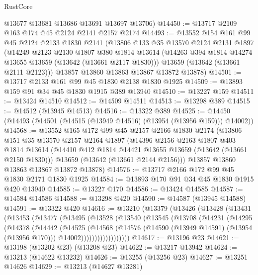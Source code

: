 \begin{lexlean}{RustCore}
\begin{coremodule}
      @13677
      @13681
      @13686
      @13691
      @13697
      @13706)
@14450 := @13717 @2109 @163 @174 @45 @2124 @2141 @2157 @2174
@14493 := @13552
    @154
    @161
    @99
    @45
    @2124
    @2133
    @1830
    @2141
    (@13806
      @133
      @35
      @13570
      @2124
      @2131
      @1897
      (@14249
        @2123
        @2130
        @1807
        @380
        @1814
        @13614
        (@14263 @394 @1814 @14274 @13655 @13659 (@13642 (@13661 @2117 @1830)))
        @13659
        (@13642 (@13661 @2111 @2123)))
      @13857
      @13860
      @13863
      @13867
      @13872
      @13878)
@14501 := @13717 @2133 @161 @99 @45 @1830 @2138 @1830 @1925
@14509 := @13893 @159 @91 @34 @45 @1830 @1915 @389 @13940
@14510 := @13227 @159
@14511 := @13424 @14510
@14512 := @14509 @14511
@14513 := @13298 @389
@14515 := @14512 (@13945 @14513)
@14516 := @13322 @389
@14525 := @14450 (@14493 (@14501 (@14515 (@13949 @14516) (@13954 (@13956 @159))) @14002))
@14568 := @13552
    @165
    @172
    @99
    @45
    @2157
    @2166
    @1830
    @2174
    (@13806
      @151
      @35
      @13570
      @2157
      @2164
      @1897
      (@14396
        @2156
        @2163
        @1807
        @403
        @1814
        @13614
        (@14410 @412 @1814 @14421 @13655 @13659 (@13642 (@13661 @2150 @1830)))
        @13659
        (@13642 (@13661 @2144 @2156)))
      @13857
      @13860
      @13863
      @13867
      @13872
      @13878)
@14576 := @13717 @2166 @172 @99 @45 @1830 @2171 @1830 @1925
@14584 := @13893 @170 @91 @34 @45 @1830 @1915 @420 @13940
@14585 := @13227 @170
@14586 := @13424 @14585
@14587 := @14584 @14586
@14588 := @13298 @420
@14590 := @14587 (@13945 @14588)
@14591 := @13322 @420
@14616 := @13210
    (@13379
      (@13426
        (@13428
          (@13431
            (@13453
              (@13477
                (@13495
                  (@13528
                    (@13540
                      (@13545
                        (@13708
                          (@14231
                            (@14295
                              (@14378
                                (@14442
                                  (@14525
                                    (@14568
                                      (@14576
                                        (@14590 (@13949 @14591) (@13954 (@13956 @170)))
                                        @14002))))))))))))))))))
@14617 := @13196 @23
@14621 := @13198 (@13202 @23) (@13208 @23)
@14622 := @13217 @13942
@14624 := @13213 (@14622 @13232)
@14626 := @13255 (@13256 @23)
@14627 := @13251 @14626
@14629 := @13213 (@14627 @13281)

\end{coremodule}
\end{lexlean}
